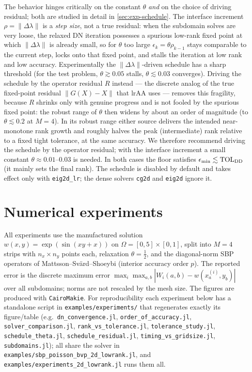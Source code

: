 \documentclass[hidelinks,onefignum,onetabnum]{siamart250211}
\newcommand{\TOL}{\mathrm{TOL}}
\begin{document}
The behavior hinges critically on the constant $\theta$ \emph{and} on the choice
of driving residual; both are studied in detail in \cref{sec:exp-schedule}.  The
interface increment $\rho=\|\Delta\lambda\|$ is a \emph{step size}, not a true
residual: when the subdomain solves are very loose, the relaxed DN iteration
possesses a spurious low-rank fixed point at which $\|\Delta\lambda\|$ is already
small, so for $\theta$ too large $\epsilon_k=\theta\rho_{k-1}$ stays comparable to
the current step, locks onto that fixed point, and stalls the iteration at low
rank and low accuracy.  Experimentally the $\|\Delta\lambda\|$-driven schedule has
a sharp threshold (for the test problem, $\theta\gtrsim0.05$ stalls, $\theta
\lesssim0.03$ converges).  Driving the schedule by the operator residual
$R$ instead --- the discrete analog of the true fixed-point residual
$\|G(X)-X\|$ that lrAA uses --- removes this fragility, because $R$ shrinks only
with genuine progress and is not fooled by the spurious fixed point: the robust
range of $\theta$ then widens by about an order of magnitude (to
$\theta\lesssim0.2$ at $M=4$).  In its robust range either source delivers the
intended near-monotone rank growth and roughly halves the peak (intermediate)
rank relative to a fixed tight tolerance, at the same accuracy.  We therefore
recommend driving the schedule by the operator residual; with the interface
increment a small constant $\theta\approx0.01$--$0.03$ is needed.  In both cases
the floor satisfies $\epsilon_{\min}\lesssim\TOL_{\rm DD}$ (it mainly sets the
final rank).  The schedule is disabled by default and takes effect only with
{\tt eig2d\_lr}; the dense solvers {\tt cg2d} and {\tt eig2d} ignore it.

\section{Numerical experiments}
\label{sec:num}
All experiments use the manufactured solution $w(x,y)=\exp(\sin(xy+x))$ on
$\Omega=[0,5]\times[0,1]$, split into $M=4$ strips with $n_x\times n_y$ points
each, relaxation $\theta=\tfrac12$, and the diagonal-norm SBP operators of
Mattsson--Sv\"ard--Shoeybi (interior accuracy order $p$).  The reported error is
the discrete maximum error $\max_i \max_{a,b} |W_i(a,b) - w(x^{(i)}_a,y_b)|$ over
all subdomains; norms are not rescaled by the mesh size.  The figures are
produced with {\tt CairoMakie}.  For reproducibility each experiment below has a
standalone script in {\tt examples/experiments/} that regenerates exactly its
figure/table (e.g.\ {\tt dn\_convergence.jl}, {\tt order\_of\_accuracy.jl},
{\tt solver\_comparison.jl}, {\tt rank\_vs\_tolerance.jl}, {\tt tolerance\_study.jl},
{\tt schedule\_theta.jl}, {\tt schedule\_residual.jl}, {\tt timing\_vs\_gridsize.jl},
{\tt subdomains.jl}); all share the solver in
{\tt examples/sbp\_poisson\_bvp\_2d\_lowrank.jl}, and
{\tt examples/experiments\_2d\_lowrank.jl} runs them all.
\end{document}
